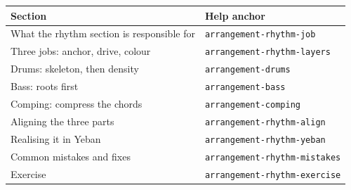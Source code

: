 \begin{helpmapping}
\begin{longtable}{p{}p{}}
\toprule
Section & Help anchor \\
\midrule
What the rhythm section is responsible for & \texttt{arrangement-rhythm-job} \\
Three jobs: anchor, drive, colour & \texttt{arrangement-rhythm-layers} \\
Drums: skeleton, then density & \texttt{arrangement-drums} \\
Bass: roots first & \texttt{arrangement-bass} \\
Comping: compress the chords & \texttt{arrangement-comping} \\
Aligning the three parts & \texttt{arrangement-rhythm-align} \\
Realising it in Yeban & \texttt{arrangement-rhythm-yeban} \\
Common mistakes and fixes & \texttt{arrangement-rhythm-mistakes} \\
Exercise & \texttt{arrangement-rhythm-exercise} \\
\bottomrule
\end{longtable}
\end{helpmapping}
